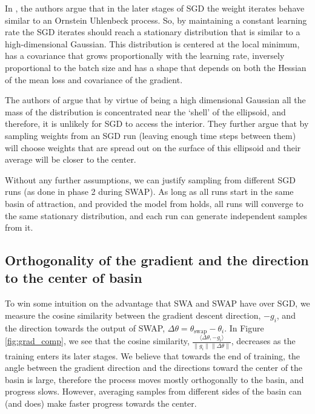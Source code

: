 \documentclass{article} %
\begin{document}
In \citep{mandt2017sgd}, the authors argue that in the later stages of SGD
the weight iterates behave similar to an Ornstein Uhlenbeck process. So, by
maintaining a constant learning rate the SGD iterates should reach a stationary
distribution that is similar to a high-dimensional Gaussian. This distribution
is centered at the local minimum, has a covariance that grows proportionally
with the learning rate, inversely proportional to the batch size and has a
shape that depends on both the Hessian of the mean loss and covariance of the
gradient.

The authors of \citep{swa} argue that by virtue of being a high dimensional Gaussian all
the mass of the distribution is concentrated near the `shell' of the ellipsoid, and
therefore, it is unlikely for SGD to access the interior. They further argue
that by sampling weights from an SGD run (leaving enough time steps between
them) will choose weights that are spread out on the surface of this ellipsoid
and their average will be closer to the center. 

Without any further assumptions, we can justify sampling from different SGD
runs (as done in phase 2 during SWAP). As long as all runs start in the same basin of attraction, and provided
the model from \citep{mandt2017sgd} holds, all runs will converge to the same
stationary distribution, and each run can generate independent samples
from it.

\vspace{-0.1in}
\subsection{Orthogonality of the gradient and the direction to the center of basin}
\vspace{-0.05in}

To win some intuition on the advantage that SWA and SWAP have over SGD, we measure
the cosine similarity between the gradient descent direction, $-g_i$, and the
direction towards the output of SWAP, $\Delta\theta =
\theta_{\text{swap}}-\theta_i$.  In Figure \ref{fig:grad_comp}, we see that the
cosine similarity, $\frac{\langle \Delta\theta, -g_i \rangle}{\|g_i\| \|\Delta
\theta\|}$, decreases as the training enters its later stages. We believe that
towards the end of training, the angle between the gradient direction and the
directions toward the center of the basin is large, therefore the process moves
mostly orthogonally to the basin, and progress slows. However,
averaging samples from different sides of the basin can (and does) make faster
progress towards the center. 
\end{document}
